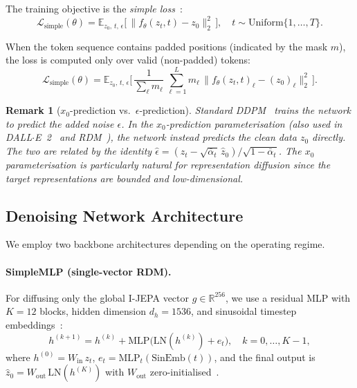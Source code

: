 \documentclass[12pt]{article}
\newtheorem{remark}[theorem]{Remark}
\begin{document}
The training objective is the \emph{simple loss}~\cite{ho2020ddpm}:
\begin{equation}\label{eq:ddpm-loss}
    \mathcal{L}_{\mathrm{simple}}(\theta)
    = \mathbb{E}_{z_0,\, t,\, \epsilon}\!
    \bigl[\,\lVert f_\theta(z_t, t) - z_0 \rVert_2^2 \,\bigr],
    \quad t \sim \mathrm{Uniform}\{1, \ldots, T\}.
\end{equation}

When the token sequence contains padded positions (indicated by the mask $m$),
the loss is computed only over valid (non-padded) tokens:
\begin{equation}\label{eq:masked-loss}
    \mathcal{L}_{\mathrm{simple}}(\theta)
    = \mathbb{E}_{z_0,\, t,\, \epsilon}\!\biggl[\,
    \frac{1}{\sum_{\ell} m_\ell}\,
    \sum_{\ell=1}^{L} m_\ell\,
    \lVert f_\theta(z_t, t)_\ell - (z_0)_\ell \rVert_2^2
    \,\biggr].
\end{equation}

\begin{remark}[$x_0$-prediction vs.\ $\epsilon$-prediction]
\label{rem:x0-vs-eps}
Standard DDPM~\cite{ho2020ddpm} trains the network to predict the added noise
$\epsilon$.  In the $x_0$-prediction parameterisation
(also used in DALL$\cdot$E~2~\cite{ramesh2022hierarchical} and
RDM~\cite{bordes2022rdm}),
the network instead predicts the clean data $z_0$ directly.
The two are related by the identity
$\hat{\epsilon} = (z_t - \sqrt{\bar{\alpha}_t}\,\hat{z}_0) / \sqrt{1 - \bar{\alpha}_t}$.
The $x_0$ parameterisation is particularly natural for representation
diffusion since the target representations are bounded and low-dimensional.
\end{remark}

\subsection{Denoising Network Architecture}
\label{sec:denoising-arch}

We employ two backbone architectures depending on the operating regime.

\paragraph{SimpleMLP (single-vector RDM).}
For diffusing only the global I-JEPA vector $g \in \mathbb{R}^{256}$,
we use a residual MLP with $K = 12$ blocks,
hidden dimension $d_h = 1536$,
and sinusoidal timestep embeddings~\cite{vaswani2017attention}:
\begin{equation}\label{eq:mlp-block}
    h^{(k+1)} = h^{(k)} + \mathrm{MLP}\!\bigl(\mathrm{LN}(h^{(k)}) + e_t\bigr),
    \quad k = 0, \ldots, K-1,
\end{equation}
where $h^{(0)} = W_{\mathrm{in}}\, z_t$, $e_t = \mathrm{MLP}_t(\mathrm{SinEmb}(t))$,
and the final output is $\hat{z}_0 = W_{\mathrm{out}}\, \mathrm{LN}(h^{(K)})$
with $W_{\mathrm{out}}$ zero-initialised~\cite{goyal2017accurate}.
\end{document}
